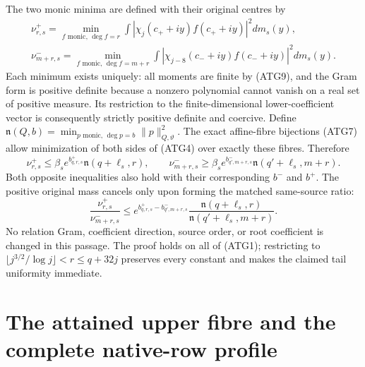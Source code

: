 \documentclass[11pt,a4paper]{article}
\begin{document}
The two monic minima are defined with their original centres by
\[
\begin{gathered}
 \nu^+_{r,s}=\min_{f\text{ monic},\,\deg f=r}
       \int|\chi_j(c_++iy)f(c_++iy)|^2dm_s(y),\\
 \nu^-_{m+r,s}=\min_{f\text{ monic},\,\deg f=m+r}
       \int|\chi_{j-8}(c_-+iy)f(c_-+iy)|^2dm_s(y).
\end{gathered}
\tag{ATG26}
\]
Each minimum exists uniquely: all moments are finite by (ATG9),
and the Gram form is positive definite because a nonzero polynomial
cannot vanish on a real set of positive measure. Its restriction to
the finite-dimensional lower-coefficient vector is consequently
strictly positive definite and coercive.
Define
$\mathfrak n(Q,b)=\min_{p\text{ monic},\,\deg p=b}
\|p\|_{Q,\vartheta}^2$.
The exact affine-fibre bijections (ATG7) allow minimization of both
sides of (ATG4) over exactly these fibres. Therefore
\[
\boxed{
 \nu^+_{r,s}\le\beta_s e^{b^+_{q,r,s}}
                       \mathfrak n(q+\ell_s,r),\qquad
 \nu^-_{m+r,s}\ge\beta_s e^{b^-_{q',m+r,s}}
                       \mathfrak n(q'+\ell_s,m+r).
}
\tag{ATG27}
\]
Both opposite inequalities also hold with their corresponding
$b^-$ and $b^+$. The positive original mass cancels only upon
forming the matched same-source ratio:
\[
 \frac{\nu^+_{r,s}}{\nu^-_{m+r,s}}
 \le e^{b^+_{q,r,s}-b^-_{q',m+r,s}}
       \frac{\mathfrak n(q+\ell_s,r)}
            {\mathfrak n(q'+\ell_s,m+r)}.
\tag{ATG28}
\]
No relation Gram, coefficient direction, source order, or root
coefficient is changed in this passage. The proof holds on all of
(ATG1); restricting to
$\lfloor j^{3/2}/\log j\rfloor<r\le q+32j$ preserves every
constant and makes the claimed tail uniformity immediate.


\begingroup
\section{The attained upper fibre and the complete native-row profile}
\label{sec:ATA}
\end{document}

